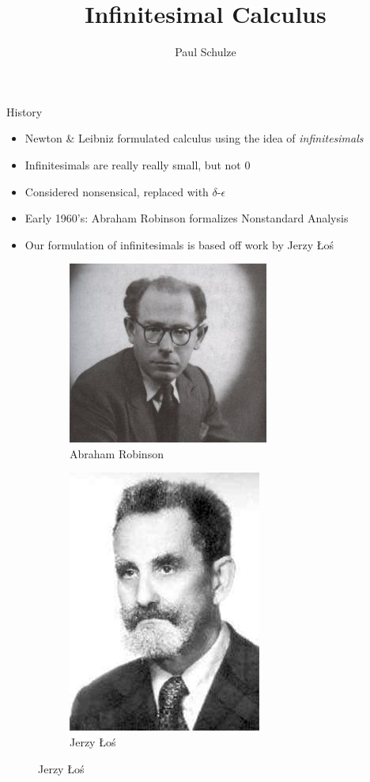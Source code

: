 \documentclass{beamer}
\title{Infinitesimal Calculus}
\author{Paul Schulze}
\date{}
\theoremstyle{plain}
\theoremstyle{definition}
\begin{document}
	
\begin{frame}
	\titlepage
\end{frame}
	

\begin{frame}{History}
\begin{itemize}
	\item Newton \& Leibniz formulated calculus using the idea of \textit{infinitesimals}
	\item Infinitesimals are really really small, but not $0$
	\item Considered nonsensical, replaced with $\delta$-$\epsilon$
	\item Early 1960's: Abraham Robinson formalizes Nonstandard Analysis
	\item Our formulation of infinitesimals is based off work by Jerzy \L o\'s
\end{itemize}
\begin{figure}[h]
	\begin{subfigure}{0.4\textwidth}
		\centering
		\includegraphics[width=0.6\linewidth]{Robinson}
		\caption{Abraham Robinson}
	\end{subfigure}
	\begin{subfigure}{0.4\textwidth}
		\centering
		\includegraphics[width=0.4\linewidth]{Los}
		\caption{Jerzy \L o\'s}
	\end{subfigure}
\end{figure}
\end{frame}
\end{document}
